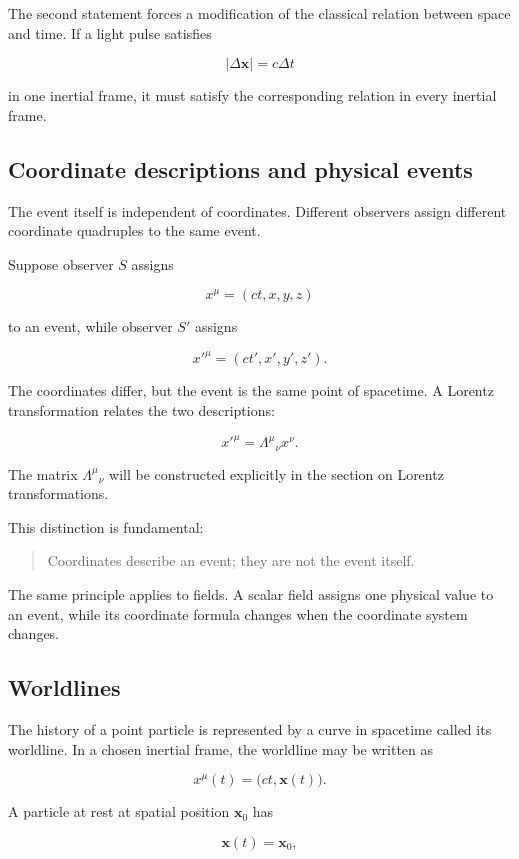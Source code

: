 The second statement forces a modification of the classical relation between space and time. If a light pulse satisfies

\[
|\Delta\mathbf{x}|=c\Delta t
\]

in one inertial frame, it must satisfy the corresponding relation in every inertial frame.

\subsection{Coordinate descriptions and physical events}

The event itself is independent of coordinates. Different observers assign different coordinate quadruples to the same event.

Suppose observer \(S\) assigns

\[
x^{\mu}=(ct,x,y,z)
\]

to an event, while observer \(S'\) assigns

\[
x'^{\mu}=(ct',x',y',z').
\]

The coordinates differ, but the event is the same point of spacetime. A Lorentz transformation relates the two descriptions:

\[
x'^{\mu}
=
\Lambda^{\mu}{}_{\nu}x^{\nu}.
\]

The matrix \(\Lambda^{\mu}{}_{\nu}\) will be constructed explicitly in the section on Lorentz transformations.

This distinction is fundamental:

\begin{quote}
Coordinates describe an event; they are not the event itself.
\end{quote}

The same principle applies to fields. A scalar field assigns one physical value to an event, while its coordinate formula changes when the coordinate system changes.

\subsection{Worldlines}

The history of a point particle is represented by a curve in spacetime called its worldline. In a chosen inertial frame, the worldline may be written as

\[
x^{\mu}(t)
=
\bigl(ct,\mathbf{x}(t)\bigr).
\]

A particle at rest at spatial position \(\mathbf{x}_{0}\) has

\[
\mathbf{x}(t)=\mathbf{x}_{0},
\]

